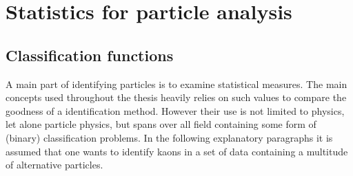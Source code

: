 \chapter{Statistics for particle analysis}
\label{chap:statistics}

\section{Classification functions}
\label{sec:classification_functions}

A main part of identifying particles is to examine statistical measures. The main concepts used throughout the thesis heavily relies on such values to compare the goodness of a identification method. However their use is not limited to physics, let alone particle physics, but spans over all field containing some form of (binary) classification problems.
In the following explanatory paragraphs it is assumed that one wants to identify kaons in a set of data containing a multitude of alternative particles.

